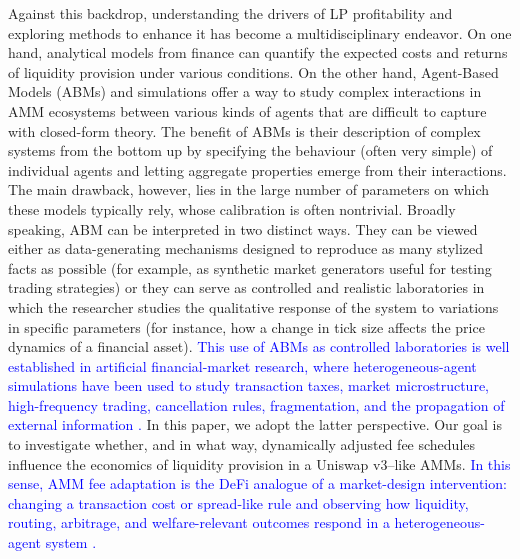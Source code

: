 \documentclass[11pt]{article}
\begin{document}
Against this backdrop, understanding the drivers of LP profitability and exploring methods to enhance it has become a 
multidisciplinary endeavor. On one hand, analytical models from finance can quantify the expected costs and returns of 
liquidity provision under various conditions. On the other hand, Agent-Based Models (ABMs) and simulations offer a way 
to study complex interactions in AMM ecosystems between various kinds of agents that are difficult to capture with 
closed-form theory. The benefit of ABMs is their description of complex systems from the bottom up by specifying the 
behaviour (often very simple) of individual agents and letting aggregate properties emerge from their interactions. 
The main drawback, however, lies in the large number of parameters on which these models typically rely, whose 
calibration is often nontrivial. Broadly speaking, ABM can be interpreted in two distinct ways. They can be viewed 
either as data-generating mechanisms designed to reproduce as many stylized facts as possible (for example, as 
synthetic market generators useful for testing trading strategies) or they can serve as controlled and realistic 
laboratories in which the researcher studies the qualitative response of the system to variations in specific 
parameters (for instance, how a change in tick size affects the price dynamics of a financial asset). \textcolor{blue}{This use of ABMs
as controlled laboratories is well established in artificial financial-market research, where heterogeneous-agent simulations
have been used to study transaction taxes, market microstructure, high-frequency trading, cancellation rules, fragmentation,
and the propagation of external information \cite{raberto2001,chakraborti2011,westerhoff2006,mannaro2008,pellizzari2009,leal2016,carro2015,mizuta2020}.}
In this paper, we adopt the latter perspective. Our goal is to investigate whether, and in what way, dynamically adjusted fee schedules
influence the economics of liquidity provision in a Uniswap v3–like AMMs. \textcolor{blue}{In this sense, AMM fee adaptation is the DeFi analogue
of a market-design intervention: changing a transaction cost or spread-like rule and observing how liquidity, routing, arbitrage,
and welfare-relevant outcomes respond in a heterogeneous-agent system \cite{westerhoff2006,mannaro2008,pellizzari2009,mizuta2020}.}
\end{document}
